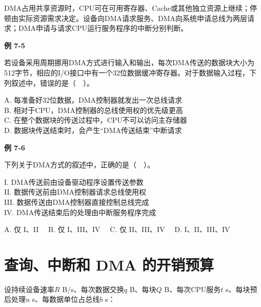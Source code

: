 DMA占用共享资源时，CPU可在可用寄存器、Cache或其他独立资源上继续；停顿由实际资源需求决定。设备向DMA请求服务、DMA向系统申请总线为两层请求；DMA申请与请求CPU运行服务程序的中断分别判断。

\par\medskip{}\noindent\hypertarget{CO07-E05}{}\label{CO07-E05}\textbf{例 7-5}\par\nobreak\smallskip

若设备采用周期挪用DMA方式进行输入和输出，每次DMA传送的数据块大小为512字节，相应的I/O接口中有一个32位数据缓冲寄存器。对于数据输入过程，下列叙述中，错误的是（　）。

A. 每准备好32位数据，DMA控制器就发出一次总线请求\\
B. 相对于CPU，DMA控制器的总线使用权的优先级更高\\
C. 在整个数据块的传送过程中，CPU不可以访问主存储器\\
D. 数据块传送结束时，会产生``DMA传送结束''中断请求

\par\medskip{}\noindent\hypertarget{CO07-E06}{}\label{CO07-E06}\textbf{例 7-6}\par\nobreak\smallskip

下列关于DMA方式的叙述中，正确的是（　）。

I. DMA传送前由设备驱动程序设置传送参数\\
II. 数据传送前由DMA控制器请求总线使用权\\
III. 数据传送由DMA控制器直接控制总线完成\\
IV. DMA传送结束后的处理由中断服务程序完成

A. 仅 I、II　 B. 仅 I、III、IV　 C. 仅 II、III、IV　 D. I、II、III、IV

\section{查询、中断和 DMA 的开销预算}\label{CO07-budget}

设持续设备速率\(R\) B/s、每次数据交换\(q\) B、每块\(Q\) B、每次CPU服务\(t\) s、每块预后处理\(u\) s、每数据单位占总线\(b\) s：

